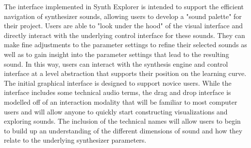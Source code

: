 The interface implemented in Synth Explorer is intended to support the efficient navigation of synthesizer sounds, allowing users to develop a "sound palette" for their project. Users are able to "look under the hood" of the visual interface and directly interact with the underlying control interface for these sounds. They can make fine adjustments to the parameter settings to refine their selected sounds as well as to gain insight into the parameter settings that lead to the resulting sound. In this way, users can interact with the synthesis engine and control interface at a level abstraction that supports their position on the learning curve. The initial graphical interface is designed to support novice users. While the interface includes some technical audio terms, the drag and drop interface is modelled off of an interaction modality that will be familiar to most computer users and will allow anyone to quickly start constructing visualizations and exploring sounds. The inclusion of the technical names will allow users to begin to build up an understanding of the different dimensions of sound and how they relate to the underlying synthesizer parameters.



